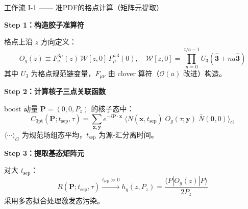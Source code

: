 \documentclass[10pt,aspectratio=169]{beamer}
\begin{document}
\begin{frame}{工作流 I-1 —— 准PDF的格点计算（矩阵元提取）}

  \textbf{Step 1：构造胶子准算符}

  格点上沿 $z$ 方向定义：
  \begin{equation*}
    O_g(z) \equiv F_a^{3\mu}(z)\,
    \mathcal{W}[z,0]\,
    F_{\mu}^{a\,3}(0),\quad
    \mathcal{W}[z,0] = \prod_{n=0}^{z/a-1} U_3(\hat{\mathbf{3}} + na\hat{\mathbf{3}})
  \end{equation*}
  其中 $U_3$ 为格点规范链变量，$F_{\mu\nu}$ 由 clover 算符（$\mathcal{O}(a)$ 改进）构造。

  \textbf{Step 2：计算核子三点关联函数}

  boost 动量 $\mathbf{P} = (0,0,P_z)$ 的核子态中：
  \begin{equation*}
    C_{3\mathrm{pt}}(\mathbf{P}; t_{\mathrm{sep}}, \tau) =
    \sum_{\mathbf{x},\mathbf{y}} e^{-i\mathbf{P}\cdot\mathbf{x}}\;
    \big\langle N(\mathbf{x}, t_{\mathrm{sep}})\;
    O_g(\tau; \mathbf{y})\;
    \bar{N}(\mathbf{0}, 0) \big\rangle_G
  \end{equation*}
  $\langle \cdots \rangle_G$ 为规范场组态平均，$t_{\mathrm{sep}}$ 为源-汇分离时间。

  \textbf{Step 3：提取基态矩阵元}

  对大 $t_{\mathrm{sep}}$：
  \begin{equation*}
    R(\mathbf{P}; t_{\mathrm{sep}}, \tau) \xrightarrow{t_{\mathrm{sep}} \gg 0}
    h_g(z, P_z) = \frac{\langle P| O_g(z) |P \rangle}{2P_z}
  \end{equation*}
  采用多态拟合处理激发态污染。\vspace{-8pt}
\end{frame}
\end{document}
